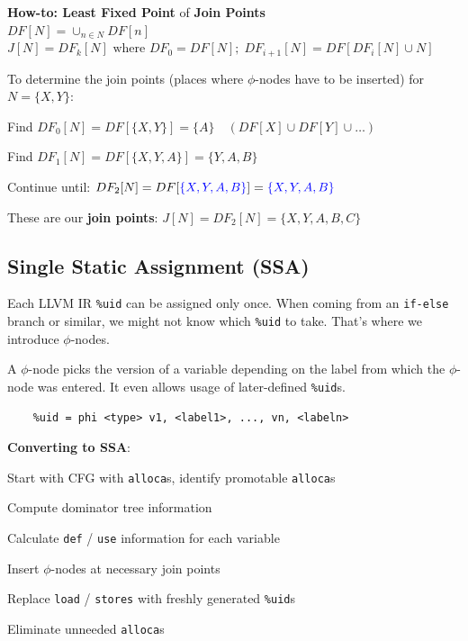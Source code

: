 \textbf{How-to: Least Fixed Point} of \textbf{Join Points} \\

$DF[N] = \cup_{n \in N}DF[n]$ \\
$J[N] = DF_k[N] \text{ where } DF_0 = DF[N];\; DF_{i+1}[N] = DF[DF_i[N] \cup N]$

\begin{minipage}{\columnwidth} %
	To determine the join points (places where $\phi$-nodes have to be inserted)
	for $N = \{X,Y\}$:
	\begin{compactitem}[$\quad\bullet$]
		\item Find $DF_0[N] = DF[\{X,Y\}] = \{A\} \quad(DF[X] \cup DF[Y] \cup \ldots)$
		\item Find $DF_1[N] = DF[\{X, Y, A\}] = \{Y,A,B\}$
		\item Continue until: $DF_2[N] = DF[\textcolor{blue}{\{X,Y,A,B\}}] = \textcolor{blue}{\{X,Y,A,B\}}$
		\item These are our \textbf{join points}: $J[N] = DF_2[N] = \{X,Y,A,B,C\}$
	\end{compactitem}

\end{minipage}

\subsection*{Single Static Assignment (SSA)}

Each LLVM IR \texttt{\%uid} can be assigned only once. When coming from an \texttt{if-else} branch or similar, we might not know which \texttt{\%uid} to take. That's where we introduce $\phi$-nodes.\medskip

A $\phi$-node picks the version of a variable depending on the label from which the $\phi$-node was entered. It even allows usage of later-defined \texttt{\%uid}s.\medskip

\begin{lstlisting}
	%uid = phi <type> v1, <label1>, ..., vn, <labeln>
\end{lstlisting}\medskip

\textbf{Converting to SSA}:
\begin{compactitem}[$\quad\bullet$]
	\item Start with CFG with \texttt{alloca}s, identify promotable \texttt{alloca}s
	\item Compute dominator tree information
	\item Calculate \texttt{def} / \texttt{use} information for each variable
	\item Insert $\phi$-nodes at necessary join points
	\item Replace \texttt{load} / \texttt{stores} with freshly generated \texttt{\%uid}s
	\item Eliminate unneeded \texttt{alloca}s
\end{compactitem}\medskip


